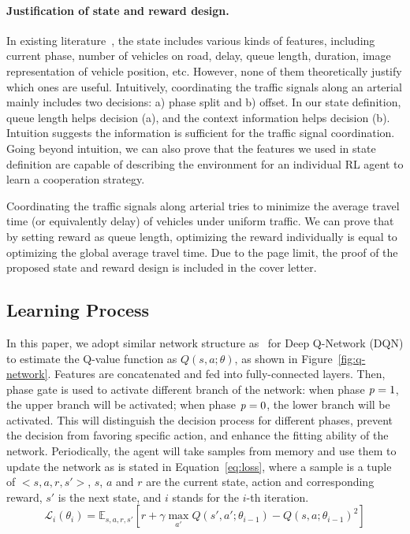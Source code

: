 \paragraph{Justification of state and reward design.}
In existing literature~\cite{VaOl16,liLW16,GenR16,wei2018intellilight}, the state includes various kinds of features, including current phase, number of vehicles on road, delay, queue length, duration, image representation of vehicle position, etc. However, none of them theoretically justify which ones are useful. Intuitively, coordinating the traffic signals along an arterial mainly includes two decisions: a) phase split and b) offset. In our state definition, queue length helps decision (a), and the context information helps decision (b). Intuition suggests the information is sufficient for the traffic signal coordination. Going beyond intuition, we can also prove that the features we used in state definition are capable of describing the environment for an individual RL agent to learn a cooperation strategy.

Coordinating the traffic signals along arterial tries to minimize the average travel time (or equivalently delay) of vehicles under uniform traffic. We can prove that by setting reward as queue length, optimizing the reward individually is equal to optimizing the global average travel time. Due to the page limit, the proof of the proposed state and reward design is included in the cover letter.


\subsection{Learning Process}
In this paper, we adopt similar network structure as~\cite{wei2018intellilight} for Deep Q-Network (DQN) to estimate the Q-value function as $Q(s, a; \theta)$, as shown in Figure~\ref{fig:q-network}.  Features are concatenated and fed into fully-connected layers. Then, phase gate is used to activate different branch of the network: when phase $\mathit{p} = 1$, the upper branch will be activated; when phase $\mathit{p} = 0$, the lower branch will be activated. This will distinguish the decision process for different phases, prevent the decision from favoring specific action, and enhance the fitting ability of the network.
Periodically, the agent will take samples from memory and use them to update the network as is stated in Equation~\ref{eq:loss},  where a sample is a tuple of $<s,a,r,s'>$, $s$, $a$ and $r$ are the current state, action and corresponding reward, $s'$ is the next state, and  $i$ stands for the $i$-th iteration.
\begin{equation}
\label{eq:loss}
\mathcal{L}_i(\theta_i) = \mathbb{E}_{s,a,r,s'}[r+\gamma\max_{a'}Q(s',a';\theta_{i-1})-Q(s,a;\theta_{i-1})^2]
\end{equation}

